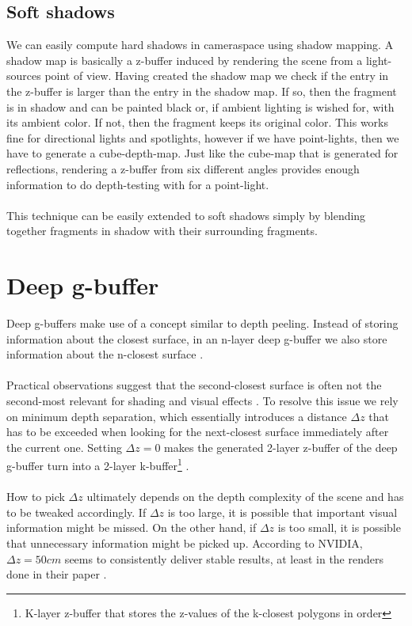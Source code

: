 \documentclass{ACGSeminar}
\begin{document}
	\subsection{Soft shadows}
		We can easily compute hard shadows in cameraspace using shadow mapping. A shadow map is basically a z-buffer induced by rendering the scene from a light-sources point of view. Having created the shadow map we check if the entry in the z-buffer is larger than the entry in the shadow map. If so, then the fragment is in shadow and can be painted black or, if ambient lighting is wished for, with its ambient color. If not, then the fragment keeps its original color. This works fine for directional lights and spotlights, however if we have point-lights, then we have to generate a cube-depth-map. Just like the cube-map that is generated for reflections, rendering a z-buffer from six different angles provides enough information to do depth-testing with for a point-light. \\\\
		This technique can be easily extended to soft shadows simply by blending together fragments in shadow with their surrounding fragments.

\section{Deep g-buffer}
	Deep g-buffers make use of a concept similar to depth peeling. Instead of storing information about the closest surface, in an n-layer deep g-buffer we also store information about the n-closest surface \cite{Mara2016DeepGBuffer}. \\\\
	Practical observations suggest that the second-closest surface is often not the second-most relevant for shading and visual effects \cite{Mara2016DeepGBuffer}. To resolve this issue we rely on minimum depth separation, which essentially introduces a distance $\Delta z$ that has to be exceeded when looking for the next-closest surface immediately after the current one. Setting $\Delta z = 0$ makes the generated 2-layer z-buffer of the deep g-buffer turn into a 2-layer k-buffer\footnote{K-layer z-buffer that stores the z-values of the k-closest polygons in order} \cite{MFEKB}. \\\\
	How to pick $\Delta z$ ultimately depends on the depth complexity of the scene and has to be tweaked accordingly. If $\Delta z$ is too large, it is possible that important visual information might be missed. On the other hand, if $\Delta z$ is too small, it is possible that unnecessary information might be picked up. According to NVIDIA, $\Delta z = 50cm$ seems to consistently deliver stable results, at least in the renders done in their paper \cite{Mara2016DeepGBuffer}.
\end{document}
